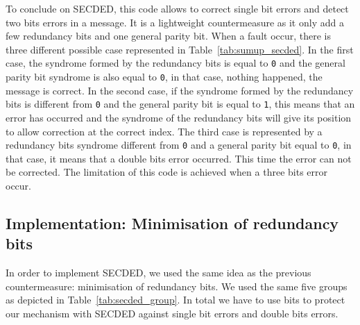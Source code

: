 To conclude on SECDED, this code allows to correct single bit errors and detect two bits errors in a message. It is a lightweight countermeasure as it only add a few redundancy bits and one general parity bit. When a fault occur, there is three different possible case represented in Table~\ref{tab:sumup_secded}. In the first case, the syndrome formed by the redundancy bits is equal to \texttt{0} and the general parity bit syndrome is also equal to \texttt{0}, in that case, nothing happened, the message is correct.
In the second case, if the syndrome formed by the redundancy bits is different from \texttt{0} and the general parity bit is equal to \texttt{1}, this means that an error has occurred and the syndrome of the redundancy bits will give its position to allow correction at the correct index.
The third case is represented by a redundancy bits syndrome different from \texttt{0} and a general parity bit equal to \texttt{0}, in that case, it means that a double bits error occurred. This time the error can not be corrected. The limitation of this code is achieved when a three bits error occur.

\subsection{Implementation: Minimisation of redundancy bits}

In order to implement SECDED, we used the same idea as the previous countermeasure: minimisation of redundancy bits. We used the same five groups as depicted in Table~\ref{tab:secded_group}. In total we have to use  bits to protect our mechanism with SECDED against single bit errors and double bits errors.

